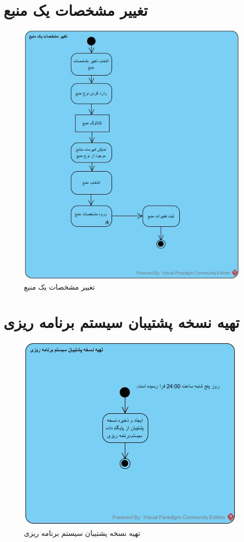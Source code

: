 \section{تغییر مشخصات یک منبع}
\begin{figure}[H]
	\centering
	\includegraphics[scale=0.8]{img/activity/changeres}
	\caption{تغییر مشخصات یک منبع}
\end{figure}


\section{تهیه نسخه پشتیبان سیستم برنامه ریزی}
\begin{figure}[H]
	\centering
	\includegraphics[scale=0.8]{img/activity/backup}
	\caption{تهیه نسخه پشتیبان سیستم برنامه ریزی}
\end{figure}

